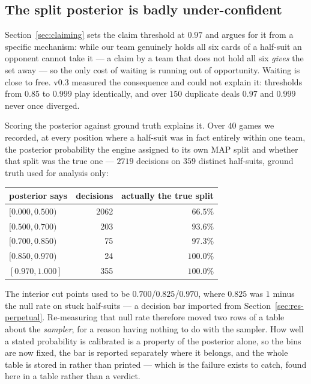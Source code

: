 \documentclass[11pt,a4paper]{article}
\begin{document}
\subsection{The split posterior is badly under-confident}
\label{sec:res-splitcal}

Section~\ref{sec:claiming} sets the claim threshold at $0.97$ and argues for it
from a specific mechanism: while our team genuinely holds all six cards of a
half-suit an opponent cannot take it --- a claim by a team that does not hold
all six \emph{gives} the set away --- so the only cost of waiting is running out
of opportunity. Waiting is close to free. v0.3 measured the consequence and
could not explain it: thresholds from $0.85$ to $0.999$ play identically, and
over $150$ duplicate deals $0.97$ and $0.999$ never once diverged.

Scoring the posterior against ground truth explains it. Over $40$ games we
recorded, at every position where a half-suit was in fact entirely within one
team, the posterior probability the engine assigned to its own MAP split and
whether that split was the true one --- $2719$ decisions on $359$ distinct
half-suits, ground truth used for analysis only:
\begin{center}
\begin{tabular}{lrr}
\toprule
posterior says & decisions & actually the true split \\
\midrule
$[0.000, 0.500)$ & 2062 & $66.5\%$ \\
$[0.500, 0.700)$ & 203 & $93.6\%$ \\
$[0.700, 0.850)$ & 75 & $97.3\%$ \\
$[0.850, 0.970)$ & 24 & $100.0\%$ \\
$[0.970, 1.000]$ & 355 & $100.0\%$ \\
\bottomrule
\end{tabular}
\end{center}

The interior cut points used to be $0.700$/$0.825$/$0.970$, where $0.825$ was
$1$ minus the null rate on stuck half-suits --- a decision bar imported from
Section~\ref{sec:res-perpetual}. Re-measuring that null rate therefore moved
two rows of a table about the \emph{sampler}, for a reason having nothing to do
with the sampler. How well a stated probability is calibrated is a property of
the posterior alone, so the bins are now fixed, the bar is reported separately
where it belongs, and the whole table is stored in
 rather than printed --- which is the
failure  exists to catch, found here in a
table rather than a verdict.
\end{document}
